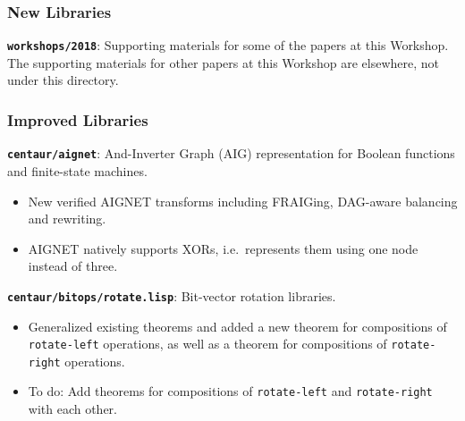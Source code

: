 \documentclass{beamer}
\newcommand{\code}[1]{\texttt{#1}}
\newcommand{\bookpath}[1]{\textbf{\code{#1}}}
\newcommand{\newlibtitle}{\frametitle{New Libraries}}
\newcommand{\implibtitle}{\frametitle{Improved Libraries}}
\newcommand{\separation}{\vspace*{1ex}}
\begin{document}

\begin{frame}

\newlibtitle

\bookpath{workshops/2018}:
Supporting materials for some of the papers at this Workshop.
The supporting materials for other papers at this Workshop
are elsewhere, not under this directory.

\end{frame}


\begin{frame}

\implibtitle

\bookpath{centaur/aignet}:
And-Inverter Graph (AIG) representation
for Boolean functions and finite-state machines.
\begin{itemize}
\item
New verified AIGNET transforms including FRAIGing, DAG-aware balancing
and rewriting.
\item
AIGNET natively supports XORs, i.e.\ represents them using one node
instead of three.
\end{itemize}

\separation

\bookpath{centaur/bitops/rotate.lisp}:
Bit-vector rotation libraries.
\begin{itemize}
\item
Generalized existing theorems and added a new theorem for compositions
of \code{rotate-left} operations, as well as a theorem for
compositions of \code{rotate-right} operations.
\item
To do: Add theorems for compositions of \code{rotate-left} and
\code{rotate-right} with each other.
\end{itemize}

\end{frame}

\end{document}
